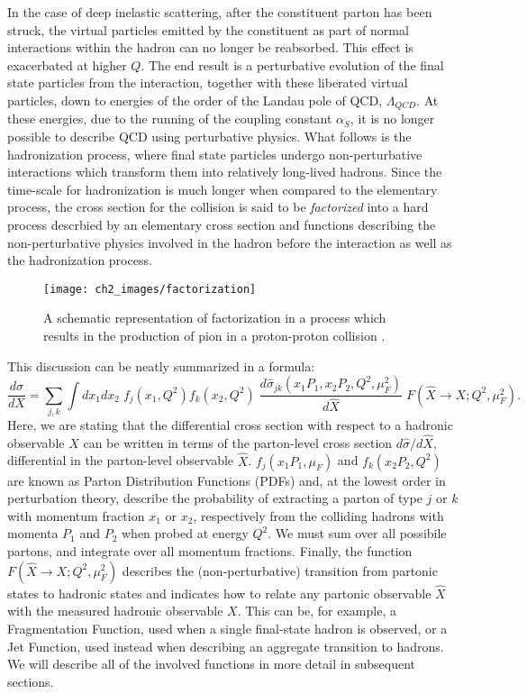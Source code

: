 \documentclass[10pt,a4paper]{book}
\begin{document}
In the case of deep inelastic scattering, after the constituent parton has been struck, the virtual particles emitted by the constituent as part of normal interactions within the hadron can no longer be reabsorbed. This effect is exacerbated at higher $Q$. The end result is a perturbative evolution of the final state particles from the interaction, together with these liberated virtual particles, down to energies of the order of the Landau pole of QCD, $\Lambda_{QCD}$. At these energies, due to the running of the coupling constant $\alpha_S$, it is no longer possible to describe QCD using perturbative physics. What follows is the hadronization process, where final state particles undergo non-perturbative interactions which transform them into relatively long-lived hadrons. Since the time-scale for hadronization is much longer when compared to the elementary process, the cross section for the collision is said to be \emph{factorized} into a hard process descrbied by an elementary cross section and functions describing the non-perturbative physics involved in the hadron before the interaction as well as the hadronization process. 


\begin{figure}
\centering
\texttt{[image: ch2\_images/factorization]}
\caption{A schematic representation of factorization in a process which results in the production of pion in a proton-proton collision \cite{Soffer}.}
\label{factorization pion}
\end{figure}

This discussion can be neatly summarized in a formula:
\begin{equation}
\frac{d\sigma}{dX} = \sum_{j,k} \int dx_1 dx_2 \; f_j(x_1, Q^2)f_k(x_2, Q^2) \; \frac{d\hat{\sigma}_{jk}(x_1P_1, x_2P_2, Q^2, \mu_F^2)}{d\hat{X}} \; F(\hat{X}\rightarrow X; Q^2, \mu_F^2).
\label{master formula}
\end{equation}
Here, we are stating that the differential cross section with respect to a hadronic observable $X$ can be written in terms of the parton-level cross section $d\hat{\sigma}/d\hat{X}$, differential in the parton-level observable $\hat{X}$. $f_j(x_1P_1, \mu_F)$ and $f_k(x_2P_2, Q^2)$ are known as Parton Distribution Functions (PDFs) and, at the lowest order in perturbation theory, describe the probability of extracting a parton of type $j$ or $k$ with momentum fraction $x_1$ or $x_2$, respectively from the colliding hadrons with momenta $P_1$ and $P_2$ when probed at energy $Q^2$. We must sum over all possibile partons, and integrate over all momentum fractions. Finally, the function $F(\hat{X}\rightarrow X; Q^2, \mu_F^2)$ describes the (non-perturbative) transition from partonic states to hadronic states and indicates how to relate any partonic observable $\hat{X}$ with the measured hadronic observable $X$. This can be, for example, a Fragmentation Function, used when a single final-state hadron is observed, or a Jet Function, used instead when describing an aggregate transition to hadrons. We will describe all of the involved functions in more detail in subsequent sections. 
\end{document}

